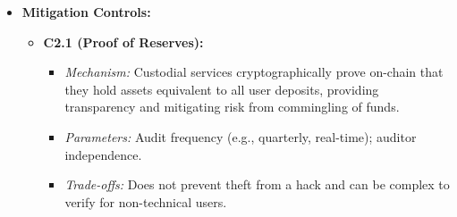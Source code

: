 \begin{itemize}
    \item \textbf{Mitigation Controls:}
        \begin{itemize}
            \item \textbf{C2.1 (Proof of Reserves):}
                \begin{itemize}
                    \item \textit{Mechanism:} Custodial services cryptographically prove on-chain that they hold assets equivalent to all user deposits, providing transparency and mitigating risk from commingling of funds\cite{dakhlallah2023proof}.
                    \item \textit{Parameters:} Audit frequency (e.g., quarterly, real-time); auditor independence.
                    \item \textit{Trade-offs:} Does not prevent theft from a hack and can be complex to verify for non-technical users.
                \end{itemize}
        \end{itemize}
\end{itemize}

